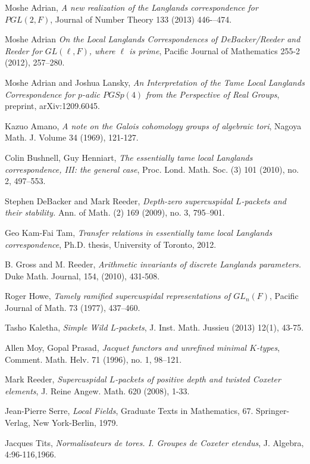\documentclass[11pt]{amsart}
\theoremstyle{plain}
\theoremstyle{definition}
\begin{document}
\begin{thebibliography}{9}

  Moshe Adrian,
  \emph{A new realization of the Langlands correspondence for $PGL(2,F)$}, Journal of Number Theory 133 (2013) 446-–474.

  Moshe Adrian
  \emph{On the Local Langlands Correspondences of DeBacker/Reeder and Reeder for $GL(\ell,F)$, where $\ell$ is prime}, Pacific Journal of Mathematics 255-2 (2012), 257--280.

  Moshe Adrian and Joshua Lansky,
  \emph{An Interpretation of the Tame Local Langlands Correspondence for $p$-adic $PGSp(4)$ from the Perspective of Real Groups}, preprint, arXiv:1209.6045.

  Kazuo Amano,
  \emph{A note on the Galois cohomology groups of algebraic tori}, Nagoya Math. J. Volume 34 (1969), 121-127.

  Colin Bushnell, Guy Henniart,
  \emph{The essentially tame local Langlands correspondence, III: the general case}, Proc. Lond. Math. Soc. (3) 101 (2010), no. 2, 497–553.

  Stephen DeBacker and Mark Reeder,
  \emph{Depth-zero supercuspidal $L$-packets and their stability.}
  Ann. of Math. (2) 169 (2009), no. 3, 795--901.

  Geo Kam-Fai Tam,
  \emph{Transfer relations in essentially tame local Langlands correspondence}, Ph.D. thesis, University of Toronto, 2012.

  B. Gross and M. Reeder,
  \emph{Arithmetic invariants of discrete Langlands parameters.}  Duke Math. Journal, 154, (2010), 431-508.

  Roger Howe,
  \emph{Tamely ramified supercuspidal representations of $GL_n(F)$},
   Pacific Journal of Math.  73  (1977),  437--460.

  Tasho Kaletha, \emph{Simple Wild L-packets}, J. Inst. Math. Jussieu (2013) 12(1), 43-75.

  Allen Moy, Gopal Prasad,
  \emph{Jacquet functors and unrefined minimal $K$-types},
   Comment. Math. Helv. 71 (1996), no. 1, 98--121.

  Mark Reeder,
  \emph{Supercuspidal $L$-packets of positive depth and twisted Coxeter elements},
  J. Reine Angew. Math. 620 (2008), 1-33.

  Jean-Pierre Serre,
  \emph{Local Fields}, Graduate Texts in Mathematics, 67. Springer-Verlag, New York-Berlin, 1979.

  Jacques Tits,
  \emph{Normalisateurs de tores. I. Groupes de Coxeter etendus}, J. Algebra, 4:96-116,1966.

\end{thebibliography}
\end{document}
